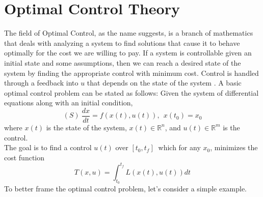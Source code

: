 \documentclass[12pt]{article}
\begin{document}
 \section{Optimal Control Theory}
 The field of Optimal Control, as the name suggests, is a branch of mathematics that deals with analyzing a system to find solutions that cause it to behave optimally for the cost we are willing to pay. If a system  is controllable \cite{Leitman} given an initial state and  some assumptions, then  we can reach a desired state of the system  by finding the appropriate control with minimum cost. Control is handled through a feedback into $u$ that depends on the state of the system .
 A basic optimal control problem  can be stated as follows:
 Given the system of differential equations  along with an initial condition,
 \begin{equation}
  (S)  \  \frac{dx}{dt}=f(x(t),u(t)), \ \ x(t_0)=x_0
 \end{equation}
 where $x(t)$ is the state of the system, $x(t)\in {\mathbb R}^n$, and $u(t)\in {\mathbb R}^m $ is the control.\\
The goal is to find  a control $u(t)$ over $[t_0, t_f]\ $ which for any $x_0$, 
minimizes the cost function 
$$ T(x,u)=\int_{t_0}^{t_f}L(x(t),u(t))dt$$
To better frame the optimal control problem, let's consider a simple example.
\end{document}
